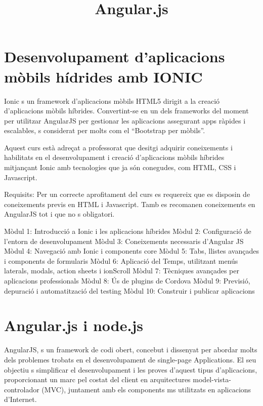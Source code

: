 \documentclass[a4paper]{article}
\begin{document}
\title{Angular.js}
\maketitle

\begin{comment}
oddsidemargin \the\oddsidemargin \newline
textwidth \the\textwidth \newline
marginparsep \the\marginparsep \newline
marginparwidth \the\marginparwidth \newline
hoffset \the\hoffset \newline
paperwidth \the\paperwidth 
\end{comment}

\section{Desenvolupament d'aplicacions mòbils hídrides amb IONIC}

 	Ionic s un framework d’aplicacions mòbils HTML5 dirigit a la creació d’aplicacions mòbils híbrides. Convertint-se en un dels frameworks del moment per utilitzar AngularJS per gestionar les aplicacions assegurant apps ràpides i escalables, s considerat per molts com el “Bootstrap per mòbils”. 

	Aquest curs està adreçat a professorat que desitgi adquirir coneixements i habilitats en el desenvolupament i creació d’aplicacions mòbils híbrides mitjançant Ionic amb tecnologies que ja són conegudes, com HTML, CSS i Javascript.

	Requisits: Per un correcte aprofitament del curs es requereix que es disposin de coneixements previs en HTML i Javascript. Tamb es recomanen coneixements en AngularJS tot i que no s obligatori. 

Mòdul 1: Introducció a Ionic i les aplicacions híbrides
Mòdul 2: Configuració de l’entorn de desenvolupament
Mòdul 3: Coneixements necessaris d’Angular JS
Mòdul 4: Navegació amb Ionic i components core
Mòdul 5: Tabs, llistes avançades i components de formularis
Mòdul 6: Aplicació del Temps, utilitzant menús laterals, modals, action sheets i ionScroll
Mòdul 7: Tècniques avançades per aplicacions professionals
Mòdul 8: Ús de plugins de Cordova
Mòdul 9: Previsió, depuració i automatització del testing
Mòdul 10: Construir i publicar aplicacions
\section{Angular.js i node.js}
AngularJS, s un framework de codi obert, concebut i dissenyat per abordar molts dels problemes trobats en el desenvolupament de single-page Applications. El seu objectiu s simplificar el desenvolupament i les proves d’aquest tipus d’aplicacions, proporcionant un marc pel costat del client en arquitectures model-vista-controlador (MVC), juntament amb els components ms utilitzats en aplicacions d’Internet.
\end{document}
